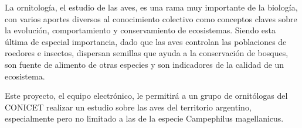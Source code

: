 La ornitología, el estudio de las aves, es una rama muy importante de la biología, con varios aportes diversos al conocimiento colectivo como conceptos claves sobre la evolución, comportamiento y conservamiento de ecosistemas. Siendo esta última de especial importancia, dado que las aves controlan las poblaciones de roedores e insectos, dispersan semillas que ayuda a la conservación de bosques, son fuente de alimento de otras especies y son indicadores de la calidad de un ecosistema.

Este proyecto, el equipo electrónico, le permitirá a un grupo de ornitólogas del CONICET realizar un estudio sobre las aves del territorio argentino, especialmente pero no limitado a las de la especie Campephilus magellanicus.